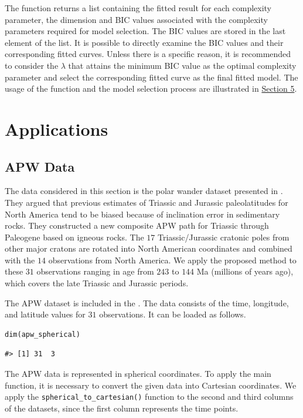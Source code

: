 The function returns a list containing the fitted result for each complexity parameter, the dimension and BIC values associated with the complexity parameters required for model selection. The BIC values are stored in the last element of the list. It is possible to directly examine the BIC values and their corresponding fitted curves. Unless there is a specific reason, it is recommended to consider the \(\lambda\) that attains the minimum BIC value as the optimal complexity parameter and select the corresponding fitted curve as the final fitted model. The usage of the function and the model selection process are illustrated in \hyperref[application]{Section 5}.

\section{Applications}\label{application}

\subsection*{APW Data}\label{apw-data}

The data considered in this section is the polar wander dataset presented in \citet{kent2010influence}. They argued that previous estimates of Triassic and Jurassic paleolatitudes for North America tend to be biased because of inclination error in sedimentary rocks. They constructed a new composite APW path for Triassic through Paleogene based on igneous rocks. The \(17\) Triassic/Jurassic cratonic poles from other major cratons are rotated into North American coordinates and combined with the \(14\) observations from North America. We apply the proposed method to these \(31\) observations ranging in age from \(243\) to \(144\) Ma (millions of years ago), which covers the late Triassic and Jurassic periods.

The APW dataset is included in the . The data consists of the time, longitude, and latitude values for \(31\) observations. It can be loaded as follows.

\begin{verbatim}
dim(apw_spherical)
\end{verbatim}

\begin{verbatim}
#> [1] 31  3
\end{verbatim}

The APW data is represented in spherical coordinates. To apply the main function, it is necessary to convert the given data into Cartesian coordinates. We apply the \texttt{spherical\_to\_cartesian()} function to the second and third columns of the datasets, since the first column represents the time points.

